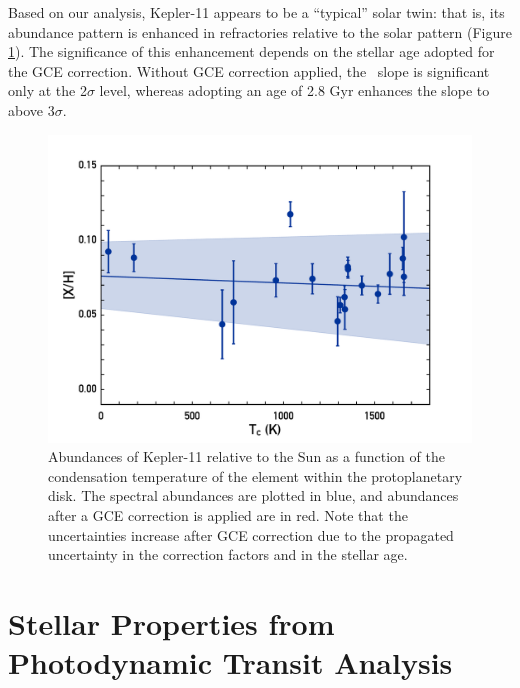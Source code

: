 \documentclass[oneside]{emulateapj}
\begin{document}
Based on our analysis, Kepler-11 appears to be a ``typical'' solar twin: that is, its abundance pattern is enhanced in refractories relative to the solar pattern (Figure \ref{fig:tc}). The significance of this enhancement depends on the stellar age adopted for the GCE correction. Without GCE correction applied, the \tc\ slope is significant only at the 2$\sigma$ level, whereas adopting an age of 2.8 Gyr enhances the slope to above 3$\sigma$.


\begin{figure}
\centering
\includegraphics[scale=0.45]{K11_Tc_linear}
\caption{Abundances of Kepler-11 relative to the Sun as a function of the condensation temperature of the element within the protoplanetary disk. The spectral abundances are plotted in blue, and abundances after a GCE correction is applied are in red. Note that the uncertainties increase after GCE correction due to the propagated uncertainty in the correction factors and in the stellar age. }
\label{fig:tc}
\end{figure}




\section{Stellar Properties from Photodynamic Transit Analysis}
\label{s:ttvs}
\end{document}
